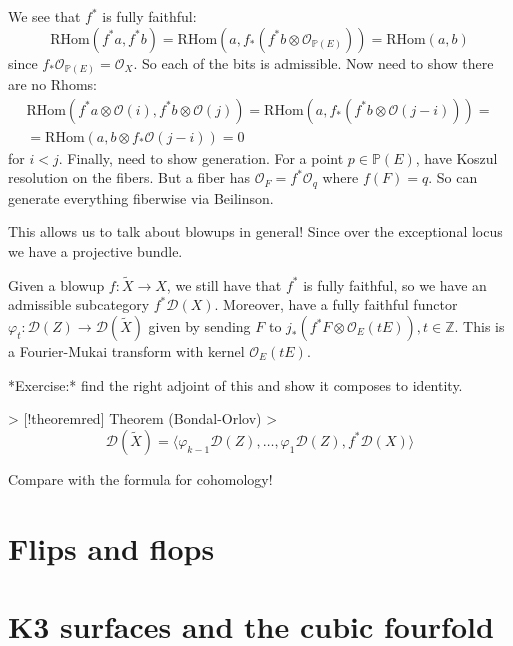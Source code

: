 We see that $f^*$ is fully faithful: $$\mathrm{RHom}(f^*a,f^*b)=\mathrm{RHom}(a, f_{*} (f^*b\otimes \mathcal{O}_{\mathbb{P}(E)}))=\mathrm{RHom}(a, b)$$since $f_*\mathcal{O}_{\mathbb{P}(E)}=\mathcal{O}_{X}$. So each of the bits is admissible. Now need to show there are no Rhoms: $$\begin{gathered}
\mathrm{RHom}(f^*a\otimes \mathcal{O}(i), f^*b\otimes \mathcal{O}(j))=\mathrm{RHom}(a, f_{*}(f^*b\otimes \mathcal{O}(j-i)))=\\
=\mathrm{RHom}(a, b\otimes f_{*}\mathcal{O}(j-i))=0
\end{gathered}$$for $i<j$. Finally, need to show generation. For a point $p\in \mathbb{P}(E)$, have Koszul resolution on the fibers. But a fiber has $\mathcal{O}_{F}=f^*\mathcal{O}_{q}$ where $f(F)=q$. So can generate everything fiberwise via Beilinson.  

This allows us to talk about blowups in general! Since over the exceptional locus we have a projective bundle. 

Given a blowup $f:\tilde{X}\xrightarrow{}X$, we still have that $f^*$ is fully faithful, so we have an admissible subcategory $f^*\mathcal{D}(X)$. Moreover, have a fully faithful functor $\varphi_{t}:\mathcal{D}(Z)\xrightarrow{}\mathcal{D}(\tilde{X})$ given by sending $F$ to $j_{*}(f^*F\otimes \mathcal{O}_{E}(tE)), t\in \mathbb{Z}$. This is a Fourier-Mukai transform with kernel $\mathcal{O}_{E}(tE)$.

*Exercise:* find the right adjoint of this and show it composes to identity.

> [!theoremred] Theorem (Bondal-Orlov)
> $$\mathcal{D}(\tilde{X})=\langle \varphi_{{k-1}}\mathcal{D}(Z),\dots,\varphi_{1}\mathcal{D}(Z), f^*\mathcal{D}(X)\rangle$$

Compare with the formula for cohomology!


\section{Flips and flops}


\section{K3 surfaces and the cubic fourfold}

